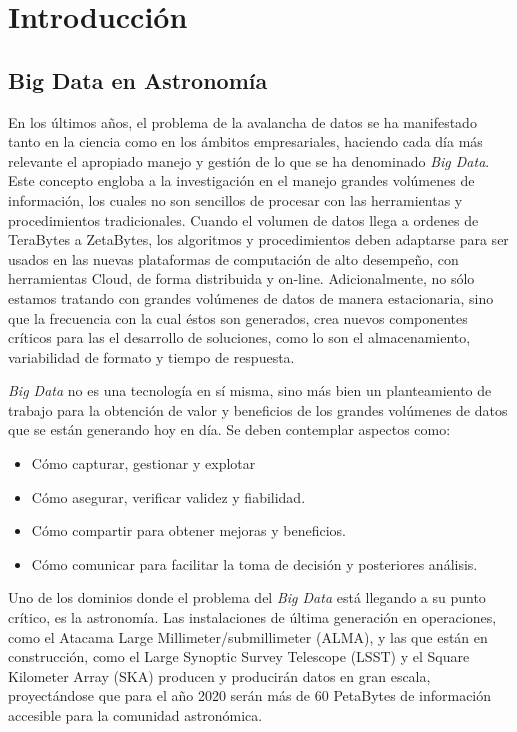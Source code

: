 \section{Introducción}

\subsection{Big Data en Astronomía}

En los últimos años, el problema de la avalancha de datos se ha manifestado
tanto en la ciencia como en los ámbitos empresariales, haciendo cada
día más relevante el apropiado manejo y gestión de lo que se ha denominado 
\emph{Big Data}.
Este concepto engloba a la investigación en el manejo grandes volúmenes de información, los cuales no son sencillos de procesar con las herramientas
y procedimientos tradicionales. Cuando el volumen de datos llega a ordenes
de TeraBytes a ZetaBytes, los algoritmos y procedimientos deben adaptarse
para ser usados en las nuevas plataformas de computación de alto desempeño, 
con herramientas Cloud, de forma distribuida y on-line.
Adicionalmente, no sólo estamos tratando con grandes volúmenes de datos
de manera estacionaria, sino que la frecuencia con la cual éstos son generados,
crea nuevos componentes críticos para las el desarrollo de soluciones,
como lo son el almacenamiento, variabilidad de formato y tiempo de respuesta.

\emph{Big Data} no es una tecnología en sí misma, sino más bien un planteamiento de
trabajo para la obtención de valor y beneficios de los grandes volúmenes de
datos que se están generando hoy en día. Se deben contemplar aspectos como:

\begin{itemize}
    \item Cómo capturar, gestionar y explotar
    \item Cómo asegurar, verificar validez y fiabilidad.
    \item Cómo compartir para obtener mejoras y beneficios.
    \item Cómo comunicar para facilitar la toma de decisión y posteriores análisis.
\end{itemize}


Uno de los dominios donde el problema del \emph{Big Data} está llegando
a su punto crítico, es la astronomía. Las instalaciones de última generación 
en operaciones, como el Atacama Large Millimeter/submillimeter (ALMA),
y las que están en construcción, como el Large Synoptic Survey Telescope (LSST) y el Square Kilometer Array (SKA)
producen y producirán datos en gran escala, proyectándose que para el año 2020
serán más de 60 PetaBytes de información accesible para la comunidad astronómica.

